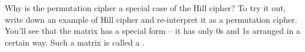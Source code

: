   Why is the permutation cipher a special case of the Hill cipher?
  To try it out, write down an example of Hill cipher and
  re-interpret it as a permutation cipher.
  You'll see that the matrix has a special form -- it has only
  0s and 1s arranged in a certain way.
  Such a matrix is called a .
